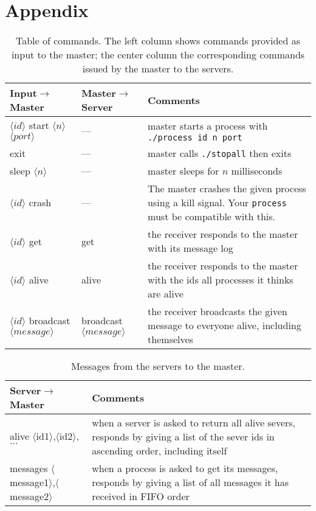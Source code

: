 \documentclass[11pt]{article}
\begin{document}
	\section{Appendix}
	\begin{table}[!h]
		\centering
		\begin{tabular}{|p{5cm}|p{3.5cm}|p{6.5cm}|}
			\hline
			Input$\to$Master & Master$\to$Server & Comments \\
			\hline
			\hline
			$\langle id\rangle$ start $\langle n\rangle$ $\langle port\rangle$& --- &
			master starts a process with \texttt{./process id n port} \\
			\hline
			exit & --- & master calls \texttt{./stopall} then exits\\
			\hline
			sleep $\langle n \rangle$ & --- & master sleeps for $n$ milliseconds\\		
			\hline
			$\langle id\rangle$ crash & --- & The master crashes the given process using a kill signal. Your \texttt{process} must be compatible with this.\\
			\hline
			\hline
			$\langle id\rangle$ get & get & the receiver responds to the master with its message log\\
			\hline
			$\langle id\rangle$ alive & alive & the receiver responds to the master with the ids all processes it thinks are alive\\
			\hline
			$\langle id\rangle$ broadcast $\langle message\rangle$ & broadcast $\langle message\rangle$ & the receiver broadcasts the given message to everyone alive, including themselves\\
			\hline
		\end{tabular}
		\caption{Table of commands. The left column shows commands
		provided as input to the master; the center column the
		corresponding commands issued by the master to the servers.}
		\label{tab:commands}
	\end{table}
	
	\begin{table}[!h]
		\centering
		\begin{tabular}{|p{6cm}|p{10cm}|}
			\hline
			Server$\to$Master & Comments \\
			\hline
			\hline
			alive $\langle$id1$\rangle$,$\langle$id2$\rangle$,$...$ & when a server is asked to return all alive severs, responds by giving a list of the sever ids in ascending order, including itself\\
			\hline
			messages $\langle$message1$\rangle$,$\langle$message2$\rangle$ & when a process is asked to get its messages, responds by giving a list of all messages it has received in FIFO order\\
			\hline
		\end{tabular}
		\caption{Messages from the servers to the master. }
		\label{tab:commands2}
	\end{table}
	
\end{document}
